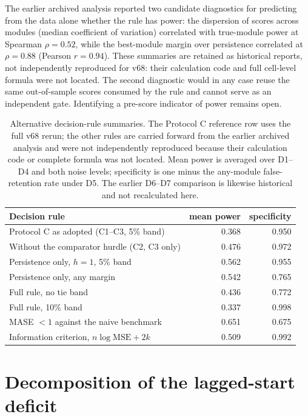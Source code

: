 \documentclass[preprint,11pt,authoryear]{elsarticle}
\theoremstyle{remark}
\begin{document}
The earlier archived analysis reported two candidate diagnostics for predicting from the data alone whether the rule has power: the dispersion of scores across modules (median coefficient of variation) correlated with true-module power at Spearman $\rho=0.52$, while the best-module margin over persistence correlated at $\rho=0.88$ (Pearson $r=0.94$). These summaries are retained as historical reports, not independently reproduced for v68: their calculation code and full cell-level formula were not located. The second diagnostic would in any case reuse the same out-of-sample scores consumed by the rule and cannot serve as an independent gate. Identifying a pre-score indicator of power remains open.

\FloatBarrier

\begin{table}[!htb]
\centering\footnotesize\setlength{\tabcolsep}{3.5pt}
\caption{Alternative decision-rule summaries. The Protocol C reference row uses the full v68 rerun; the other rules are carried forward from the earlier archived analysis and were not independently reproduced because their calculation code or complete formula was not located. Mean power is averaged over D1--D4 and both noise levels; specificity is one minus the any-module false-retention rate under D5. The earlier D6--D7 comparison is likewise historical and not recalculated here.}
\label{tab:si_rules}
\begin{tabular}{@{}lrr@{}}
\toprule
Decision rule & mean power & specificity \\
\midrule
Protocol C as adopted (C1--C3, 5\% band) & 0.368 & 0.950 \\
Without the comparator hurdle (C2, C3 only) & 0.476 & 0.972 \\
Persistence only, $h=1$, 5\% band & 0.562 & 0.955 \\
Persistence only, any margin & 0.542 & 0.765 \\
Full rule, no tie band & 0.436 & 0.772 \\
Full rule, 10\% band & 0.337 & 0.998 \\
MASE $<1$ against the naive benchmark & 0.651 & 0.675 \\
Information criterion, $n\log\mathrm{MSE} + 2k$ & 0.509 & 0.992 \\
\bottomrule
\end{tabular}
\end{table}

\section{Decomposition of the lagged-start deficit}\label{si:m4}
\end{document}

